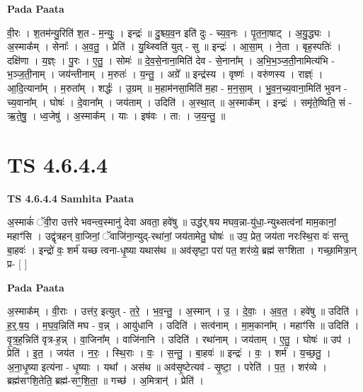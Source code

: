 \documentclass[17pt]{extarticle}
\begin{document}
\textbf{Pada Paata} \newline

वी॒रः । श॒तम॑न्यु॒रिति॑ श॒त - म॒न्युः॒ । इन्द्रः॑ ॥ दु॒श्च्य॒व॒न इति॑ दुः - च्य॒व॒नः । पृ॒त॒ना॒षाट् । अ॒यु॒द्ध्यः । अ॒स्माक᳚म् । सेनाः᳚ । अ॒व॒तु॒ । प्रेति॑ । यु॒थ्स्विति॑ युत् - सु ॥ इन्द्रः॑ । आ॒सा॒म् । ने॒ता । बृह॒स्पतिः॑ । दक्षि॑णा । य॒ज्ञ्ः । पु॒रः । ए॒तु॒ । सोमः॑ ॥ दे॒व॒से॒नाना॒मिति॑ देव - से॒नाना᳚म् । अ॒भि॒भ॒ञ्ज॒ती॒नामित्य॑भि - भ॒ञ्ज॒ती॒नाम् । जय॑न्तीनाम् । म॒रुतः॑ । य॒न्तु॒ । अग्रे᳚ ॥ इन्द्र॑स्य । वृष्णः॑ । वरु॑णस्य । राज्ञ्ः॑ । आ॒दि॒त्याना᳚म् । म॒रुता᳚म् । शर्द्धः॑ । उ॒ग्रम् ॥ म॒हाम॑नसा॒मिति॑ म॒हा - म॒न॒सा॒म् । भु॒व॒न॒च्य॒वाना॒मिति॑ भुवन - च्य॒वाना᳚म् । घोषः॑ । दे॒वाना᳚म् । जय॑ताम् । उदिति॑ । अ॒स्था॒त् ॥ अ॒स्माक᳚म् । इन्द्रः॑ । समृ॑ते॒ष्विति॒ सं - ऋ॒ते॒षु॒ । ध्व॒जेषु॑ । अ॒स्माक᳚म् । याः । इष॑वः । ता: । ज॒य॒न्तु॒ ॥  \newline





\section{ TS 4.6.4.4 }

\textbf{TS 4.6.4.4 } \newline
\textbf{Samhita Paata} \newline

अ॒स्माकं॑ ॅवी॒रा उत्त॑रे भवन्त्व॒स्मानु॑ देवा अवता॒ हवे॑षु ॥ उद्ध॑र्.षय मघव॒न्ना-यु॑धा॒-न्युथ्सत्व॑नां माम॒कानां॒ महाꣳ॑सि । उद्वृ॑त्रहन् वा॒जिनां॒ ॅवाजि॑ना॒न्युद्-रथा॑नां॒ जय॑तामेतु॒ घोषः॑ ॥ उप॒ प्रेत॒ जय॑ता नरःस्थि॒रा वः॑ सन्तु बा॒हवः॑ । इन्द्रो॑ वः॒ शर्म॑ यच्छ त्वना-धृ॒ष्या यथास॑थ ॥ अव॑सृष्टा॒ परा॑ पत॒ शर॑व्ये॒ ब्रह्म॑ सꣳशिता । गच्छा॒मित्रा॒न् प्र- [  ] \newline

\textbf{Pada Paata} \newline

अ॒स्माक᳚म् । वी॒राः । उत्त॑र॒ इत्युत् - त॒रे॒ । भ॒व॒न्तु॒ । अ॒स्मान् । उ॒ । दे॒वाः॒ । अ॒व॒त॒ । हवे॑षु ॥ उदिति॑ । ह॒र्॒.ष॒य॒ । म॒घ॒व॒न्निति॑ मघ - व॒न्न् । आयु॑धानि । उदिति॑ । सत्व॑नाम् । मा॒म॒काना᳚म् । महाꣳ॑सि ॥ उदिति॑ । वृ॒त्र॒ह॒न्निति॑ वृत्र-ह॒न्न् । वा॒जिना᳚म् । वाजि॑नानि । उदिति॑ । रथा॑नाम् । जय॑ताम् । ए॒तु॒ । घोषः॑ ॥ उप॑ । प्रेति॑ । इ॒त॒ । जय॑त । न॒रः॒ । स्थि॒राः । वः॒ । स॒न्तु॒ । बा॒हवः॑ ॥ इन्द्रः॑ । वः॒ । शर्म॑ । य॒च्छ॒तु॒ । अ॒ना॒धृ॒ष्या इत्य॑ना - धृ॒ष्याः । यथा᳚ । अस॑थ ॥ अव॑सृ॒ष्टेत्यव॑ - सृ॒ष्टा॒ । परेति॑ । प॒त॒ । शर॑व्ये । ब्रह्म॑सꣳशि॒तेति॒ ब्रह्म॑-सꣳ॒॒शि॒ता॒ ॥ गच्छ॑ । अ॒मित्रान्॑ । प्रेति॑ ।  \newline
\end{document}
